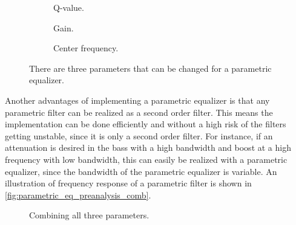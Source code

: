 \begin{figure}[H]
\centering
\hspace*{-1cm}
\begin{subfigure}[t]{0.3\textwidth}
	
	\caption{Q-value.}
	\label{fig:parametric_q}
\end{subfigure}
\hspace{2mm} 
\begin{subfigure}[t]{0.3\textwidth}
	
	\caption{Gain.}
	\label{fig:parametric_db}
\end{subfigure}
\hspace{2mm}
\begin{subfigure}[t]{0.3\textwidth}
	
	\caption{Center frequency.}
	\label{fig:parametric_fc}
\end{subfigure}
\caption{There are three parameters that can be changed for a parametric equalizer.}
\label{fig:parametric_equalizer}
\end{figure}

Another advantages of implementing a parametric equalizer is that any parametric filter can be realized as a second order filter. This means the implementation can be done efficiently and without a high risk of the filters getting unstable, since it is only a second order filter. For instance, if an attenuation is desired in the bass with a high bandwidth and boost at a high frequency with low bandwidth, this can easily be realized with a parametric equalizer, since the bandwidth of the parametric equalizer is variable. An illustration of frequency response of a parametric filter is shown in \autoref{fig:parametric_eq_preanalysis_comb}.

\begin{figure}[H]
\centering
{}

\caption{Combining all three parameters.}
\label{fig:parametric_eq_preanalysis_comb}
\end{figure}


